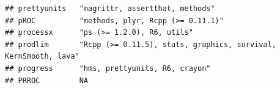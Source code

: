 \documentclass[]{article}
\begin{document}
\begin{verbatim}
## prettyunits   "magrittr, assertthat, methods"                                                                                                                                                                                                                                                                                                                                                                                                                                                       
## pROC          "methods, plyr, Rcpp (>= 0.11.1)"                                                                                                                                                                                                                                                                                                                                                                                                                                                     
## processx      "ps (>= 1.2.0), R6, utils"                                                                                                                                                                                                                                                                                                                                                                                                                                                            
## prodlim       "Rcpp (>= 0.11.5), stats, graphics, survival, KernSmooth, lava"                                                                                                                                                                                                                                                                                                                                                                                                                       
## progress      "hms, prettyunits, R6, crayon"                                                                                                                                                                                                                                                                                                                                                                                                                                                        
## PRROC         NA                                                                                                                                                                                                                                                                                                                                                                                                                                                                                    

\end{verbatim}
\end{document}
